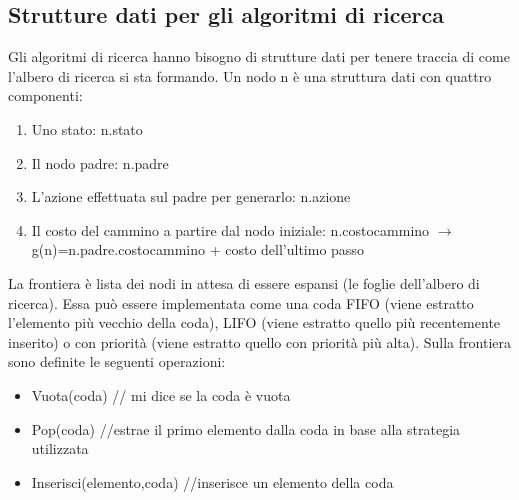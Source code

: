\documentclass{article}
\begin{document}
\subsection{Strutture dati per gli algoritmi di ricerca}
Gli algoritmi di ricerca hanno bisogno di strutture dati per tenere traccia di come l'albero di ricerca si sta formando. \newline
Un nodo n è una struttura dati con quattro componenti:
\begin{enumerate}
    \item Uno stato: n.stato
    \item Il nodo padre: n.padre
    \item L'azione effettuata sul padre per generarlo: n.azione
    \item Il costo del cammino a partire dal nodo iniziale: n.costocammino $\rightarrow$ g(n)=n.padre.costocammino + costo dell'ultimo passo
\end{enumerate}
La frontiera è lista dei nodi in attesa di essere espansi (le foglie dell'albero di ricerca). Essa può essere implementata come una coda FIFO (viene estratto l'elemento più vecchio della coda), LIFO (viene estratto quello più recentemente inserito) o con priorità (viene estratto quello con priorità più alta). Sulla frontiera sono definite le seguenti operazioni:
\begin{itemize}
    \item Vuota(coda) // mi dice se la coda è vuota
    \item Pop(coda) //estrae il primo elemento dalla coda in base alla strategia utilizzata
    \item Inserisci(elemento,coda) //inserisce un elemento della coda
\end{itemize}
\end{document}

